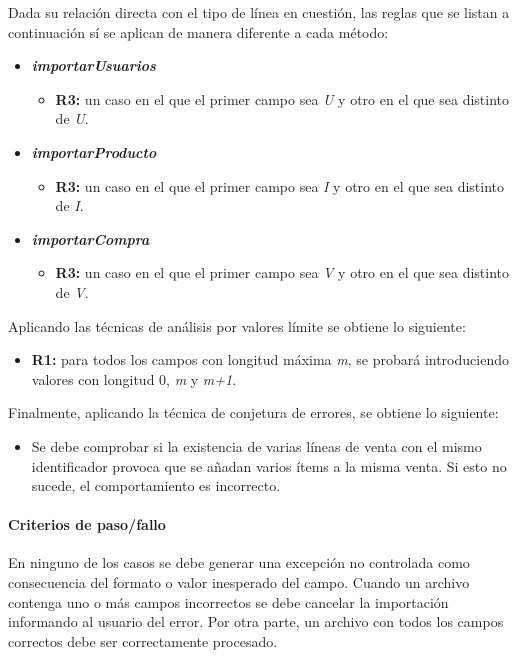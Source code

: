 \documentclass[10pt,a4paper]{article}
\begin{document}
			Dada su relación directa con el tipo de línea en cuestión, las reglas que se listan a continuación sí se aplican de manera diferente a cada método:
			\begin{itemize}
				\item \textbf{\textit{importarUsuarios}}
					\begin{itemize}
						\item \textbf{R3:} un caso en el que el primer campo sea \textit{U} y otro en el que sea distinto de \textit{U}.
					\end{itemize}
				\item \textbf{\textit{importarProducto}}
					\begin{itemize}
						\item \textbf{R3:} un caso en el que el primer campo sea \textit{I} y otro en el que sea distinto de \textit{I}.
					\end{itemize}
				\item \textbf{\textit{importarCompra}}
					\begin{itemize}
						\item \textbf{R3:} un caso en el que el primer campo sea \textit{V} y otro en el que sea distinto de \textit{V}.
					\end{itemize}
			\end{itemize}
			Aplicando las técnicas de análisis por valores límite se obtiene lo siguiente:
			\begin{itemize}
				\item \textbf{R1:} para todos los campos con longitud máxima \textit{m}, se probará introduciendo valores con longitud 0, \textit{m} y \textit{m+1}.
			\end{itemize}
			Finalmente, aplicando la técnica de conjetura de errores, se obtiene lo siguiente:
			\begin{itemize}
				\item Se debe comprobar si la existencia de varias líneas de venta con el mismo identificador provoca que se añadan varios ítems a la misma venta. Si esto no sucede, el comportamiento es incorrecto.
			\end{itemize}
			\paragraph{Criterios de paso/fallo}
	En ninguno de los casos se debe generar una excepción no controlada como consecuencia del formato o valor inesperado del campo. Cuando un archivo contenga uno o más campos incorrectos se debe cancelar la importación informando al usuario del error. Por otra parte, un archivo con todos los campos correctos debe ser correctamente procesado.
\end{document}
